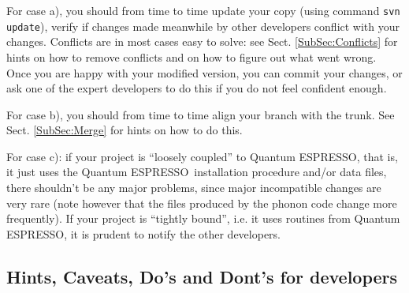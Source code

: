 \documentclass[12pt,a4paper]{article}
\def\qe{{\sc Quantum ESPRESSO}}
\begin{document}
For case a), you should from time to time update your copy (using command
\texttt{svn update}), verify if changes made meanwhile by other developers
conflict with your changes. Conflicts are in most cases easy to solve:
see Sect. \ref{SubSec:Conflicts} for hints on how to 
remove conflicts and on how to figure out what went wrong.
Once you are happy with your modified version, you can commit your
changes, or ask one of the expert developers to do this if you do not
feel confident enough.

For case b), you should from time to time align your branch with the
trunk. See Sect. \ref{SubSec:Merge} for hints on how to do this.

For case c): if your project is ``loosely coupled'' to \qe, that is,
it just uses the \qe\ installation procedure and/or data files, there
shouldn't be any major problems, since major incompatible changes are
very rare (note however that the files produced by the phonon code
change more frequently). If your project is ``tightly bound'', i.e. 
it uses routines from \qe, it is prudent to notify the other
developers.

\subsection{Hints, Caveats, Do's and Dont's for developers}
\end{document}
